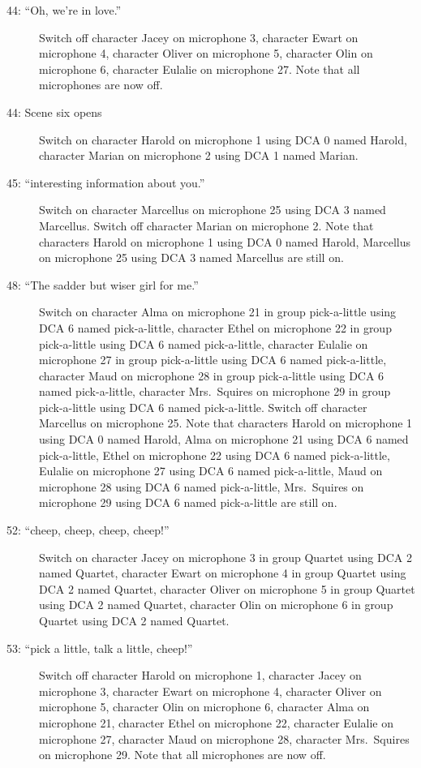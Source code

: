 \begin{description}
\item[44: ``Oh, we're in love.'']
Switch off character Jacey on microphone 3, character Ewart on microphone 4, character Oliver on microphone 5, character Olin on microphone 6, character Eulalie on microphone 27. Note that all microphones are now off.

\item[44: Scene six opens]
Switch on character Harold on microphone 1 using DCA 0 named Harold, character Marian on microphone 2 using DCA 1 named Marian. 

\item[45: ``interesting information about you.'']
Switch on character Marcellus on microphone 25 using DCA 3 named Marcellus. Switch off character Marian on microphone 2. Note that characters Harold on microphone 1 using DCA 0 named Harold, Marcellus on microphone 25 using DCA 3 named Marcellus are still on.  

\item[48: ``The sadder but wiser girl for me.'']
Switch on character Alma on microphone 21 in group pick-a-little using DCA 6 named pick-a-little, character Ethel on microphone 22 in group pick-a-little using DCA 6 named pick-a-little, character Eulalie on microphone 27 in group pick-a-little using DCA 6 named pick-a-little, character Maud on microphone 28 in group pick-a-little using DCA 6 named pick-a-little, character Mrs.~Squires on microphone 29 in group pick-a-little using DCA 6 named pick-a-little. Switch off character Marcellus on microphone 25. Note that characters Harold on microphone 1 using DCA 0 named Harold, Alma on microphone 21 using DCA 6 named pick-a-little, Ethel on microphone 22 using DCA 6 named pick-a-little, Eulalie on microphone 27 using DCA 6 named pick-a-little, Maud on microphone 28 using DCA 6 named pick-a-little, Mrs.~Squires on microphone 29 using DCA 6 named pick-a-little are still on.  

\item[52: ``cheep, cheep, cheep, cheep!'']
Switch on character Jacey on microphone 3 in group Quartet using DCA 2 named Quartet, character Ewart on microphone 4 in group Quartet using DCA 2 named Quartet, character Oliver on microphone 5 in group Quartet using DCA 2 named Quartet, character Olin on microphone 6 in group Quartet using DCA 2 named Quartet. 

\item[53: ``pick a little, talk a little, cheep!'']
Switch off character Harold on microphone 1, character Jacey on microphone 3, character Ewart on microphone 4, character Oliver on microphone 5, character Olin on microphone 6, character Alma on microphone 21, character Ethel on microphone 22, character Eulalie on microphone 27, character Maud on microphone 28, character Mrs.~Squires on microphone 29. Note that all microphones are now off.


\end{description}

